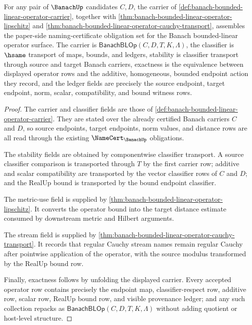 \begin{theorem}
\label{thm:banach-bounded-linear-operator-namecert-obligations}
For any pair of $\BanachUp$ candidates $C,D$, the carrier of
\autoref{def:banach-bounded-linear-operator-carrier}, together with
\autoref{thm:banach-bounded-linear-operator-lipschitz} and
\autoref{thm:banach-bounded-linear-operator-cauchy-transport}, assembles the
paper-side naming-certificate obligation set for the Banach bounded-linear
operator surface. The carrier is $\mathsf{BanachBLOp}(C,D,T,K,\Lambda)$, the
classifier is $\hsame$ transport of maps, bounds, and ledgers, stability is
classifier transport through source and target Banach carriers, exactness is
the equivalence between displayed operator rows and the additive, homogeneous,
bounded endpoint action they record, and the ledger fields are precisely the
source endpoint, target endpoint, norm, scalar, compatibility, and bound
witness rows.
\end{theorem}
\begin{proof}
The carrier and classifier fields are those of
\autoref{def:banach-bounded-linear-operator-carrier}. They are stated over
the already certified Banach carriers $C$ and $D$, so source endpoints, target
endpoints, norm values, and distance rows are all read through the existing
$\NameCert_{\BanachUp}$ obligations.

The stability fields are obtained by componentwise classifier transport. A
source classifier comparison is transported through $T$ by the first carrier
row; additive and scalar compatibility are transported by the vector
classifier rows of $C$ and $D$; and the RealUp bound is transported by the
bound endpoint classifier.

The metric-use field is supplied by
\autoref{thm:banach-bounded-linear-operator-lipschitz}. It converts the
operator bound into the target distance estimate consumed by downstream
metric and Hilbert arguments.

The stream field is supplied by
\autoref{thm:banach-bounded-linear-operator-cauchy-transport}. It records that
regular Cauchy stream names remain regular Cauchy after pointwise application
of the operator, with the source modulus transformed by the RealUp bound row.

Finally, exactness follows by unfolding the displayed carrier. Every accepted
operator row contains precisely the endpoint map, classifier-respect row,
additive row, scalar row, RealUp bound row, and visible provenance ledger; and
any such collection repacks as
$\mathsf{BanachBLOp}(C,D,T,K,\Lambda)$ without adding quotient or host-level
structure.
\end{proof}

